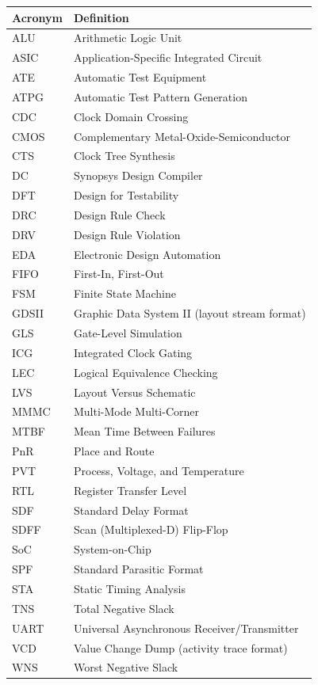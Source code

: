 \documentclass[11pt,a4paper]{article}
\begin{document}
{\small
\renewcommand{\arraystretch}{1.15}
\begin{tabularx}{\textwidth}{|l|Y|}
\hline
\textbf{Acronym} & \textbf{Definition} \\
\hline
ALU & Arithmetic Logic Unit \\
\hline
ASIC & Application-Specific Integrated Circuit \\
\hline
ATE & Automatic Test Equipment \\
\hline
ATPG & Automatic Test Pattern Generation \\
\hline
CDC & Clock Domain Crossing \\
\hline
CMOS & Complementary Metal-Oxide-Semiconductor \\
\hline
CTS & Clock Tree Synthesis \\
\hline
DC & Synopsys Design Compiler \\
\hline
DFT & Design for Testability \\
\hline
DRC & Design Rule Check \\
\hline
DRV & Design Rule Violation \\
\hline
EDA & Electronic Design Automation \\
\hline
FIFO & First-In, First-Out \\
\hline
FSM & Finite State Machine \\
\hline
GDSII & Graphic Data System II (layout stream format) \\
\hline
GLS & Gate-Level Simulation \\
\hline
ICG & Integrated Clock Gating \\
\hline
LEC & Logical Equivalence Checking \\
\hline
LVS & Layout Versus Schematic \\
\hline
MMMC & Multi-Mode Multi-Corner \\
\hline
MTBF & Mean Time Between Failures \\
\hline
PnR & Place and Route \\
\hline
PVT & Process, Voltage, and Temperature \\
\hline
RTL & Register Transfer Level \\
\hline
SDF & Standard Delay Format \\
\hline
SDFF & Scan (Multiplexed-D) Flip-Flop \\
\hline
SoC & System-on-Chip \\
\hline
SPF & Standard Parasitic Format \\
\hline
STA & Static Timing Analysis \\
\hline
TNS & Total Negative Slack \\
\hline
UART & Universal Asynchronous Receiver/Transmitter \\
\hline
VCD & Value Change Dump (activity trace format) \\
\hline
WNS & Worst Negative Slack \\
\hline
\end{tabularx}}
\end{document}

